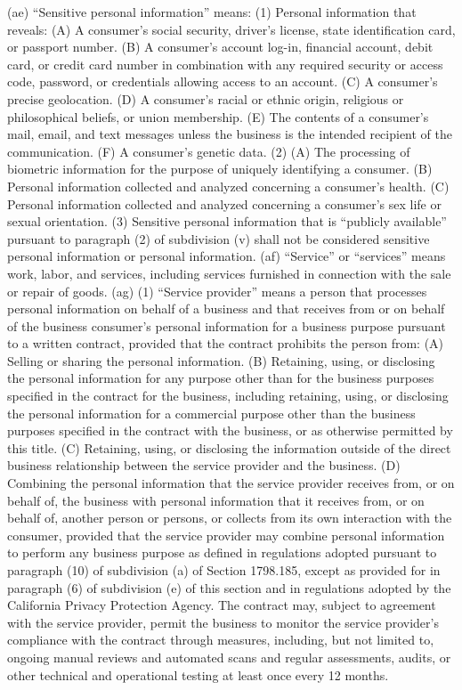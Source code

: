 (ae) “Sensitive personal information” means:
(1) Personal information that reveals:
(A) A consumer’s social security, driver’s license, state identification card, or passport number.
(B) A consumer’s account log-in, financial account, debit card, or credit card number in combination with any required security or access code, password, or credentials allowing access to an account.
(C) A consumer’s precise geolocation.
(D) A consumer’s racial or ethnic origin, religious or philosophical beliefs, or union membership.
(E) The contents of a consumer’s mail, email, and text messages unless the business is the intended recipient of the communication.
(F) A consumer’s genetic data.
(2) (A) The processing of biometric information for the purpose of uniquely identifying a consumer.
(B) Personal information collected and analyzed concerning a consumer’s health.
(C) Personal information collected and analyzed concerning a consumer’s sex life or sexual orientation.
(3) Sensitive personal information that is “publicly available” pursuant to paragraph (2) of subdivision (v) shall not be considered sensitive personal information or personal information.
(af) “Service” or “services” means work, labor, and services, including services furnished in connection with the sale or repair of goods.
(ag) (1) “Service provider” means a person that processes personal information on behalf of a business and that receives from or on behalf of the business consumer’s personal information for a business purpose pursuant to a written contract, provided that the contract prohibits the person from:
(A) Selling or sharing the personal information.
(B) Retaining, using, or disclosing the personal information for any purpose other than for the business purposes specified in the contract for the business, including retaining, using, or disclosing the personal information for a commercial purpose other than the business purposes specified in the contract with the business, or as otherwise permitted by this title.
(C) Retaining, using, or disclosing the information outside of the direct business relationship between the service provider and the business.
(D) Combining the personal information that the service provider receives from, or on behalf of, the business with personal information that it receives from, or on behalf of, another person or persons, or collects from its own interaction with the consumer, provided that the service provider may combine personal information to perform any business purpose as defined in regulations adopted pursuant to paragraph (10) of subdivision (a) of Section 1798.185, except as provided for in paragraph (6) of subdivision (e) of this section and in regulations adopted by the California Privacy Protection Agency. The contract may, subject to agreement with the service provider, permit the business to monitor the service provider’s compliance with the contract through measures, including, but not limited to, ongoing manual reviews and automated scans and regular assessments, audits, or other technical and operational testing at least once every 12 months.
